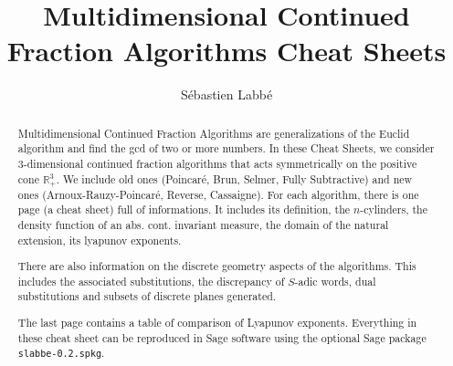 \documentclass[10pt,landscape,a4paper]{article}
\begin{document}
\title{Multidimensional Continued Fraction Algorithms Cheat Sheets}
\author{Sébastien Labbé}

\maketitle

\begin{abstract}
    Multidimensional Continued Fraction Algorithms are generalizations of the
    Euclid algorithm and find the gcd of two or more numbers.
    In these Cheat Sheets, we consider $3$-dimensional continued fraction
    algorithms that acts symmetrically on the positive cone $\mathbb{R}^3_+$.
    We include old ones (Poincar\'e, Brun, Selmer, Fully Subtractive)
    and new ones (Arnoux-Rauzy-Poincar\'e, Reverse, Cassaigne).
    For each algorithm, there is one page (a cheat sheet) full of
    informations. It includes its definition, the $n$-cylinders, the density
    function of an abs. cont. invariant measure, the domain of the natural
    extension, its lyapunov exponents.

    There are also information on the discrete geometry aspects of the
    algorithms. This includes the associated substitutions,
    the discrepancy of $S$-adic words, dual substitutions and subsets of
    discrete planes generated.
    
    The last page contains a table of comparison of Lyapunov exponents.
    Everything in these cheat sheet can be reproduced in Sage software using
    the optional Sage package \texttt{slabbe-0.2.spkg}.
\end{abstract}


\thispagestyle{empty} %

\begin{multicols}{3}
\setlength{\premulticols}{1pt}
\setlength{\postmulticols}{1pt}
\setlength{\multicolsep}{1pt}
\setlength{\columnsep}{2pt}
\newcommand{\note}[1]{\hfill\textrm{\textcolor{gray}{#1}}}
\newcommand{\args}[1]{\textit{\textcolor{blue}{#1}}}
\newcommand{\stdout}[1]{\textcolor{Sepia}{#1}}

\tableofcontents

\raggedright
\footnotesize


\newpage


\end{multicols}
\end{document}
